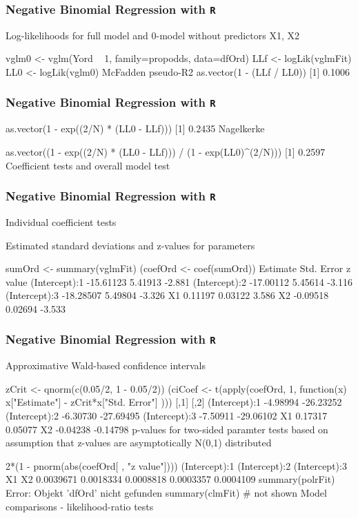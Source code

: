 \begin{frame}[fragile]
\frametitle{Negative Binomial Regression with \texttt{R} }
\Large
Log-likelihoods for full model and 0-model without predictors X1, X2

vglm0 <- vglm(Yord ~ 1, family=propodds, data=dfOrd)
LLf   <- logLik(vglmFit)
LL0   <- logLik(vglm0)
McFadden pseudo-R2
as.vector(1 - (LLf / LL0))
[1] 0.1006
\end{frame}
\begin{frame}[fragile]
\frametitle{Negative Binomial Regression with \texttt{R} }
\Large
as.vector(1 - exp((2/N) * (LL0 - LLf)))
[1] 0.2435
Nagelkerke

as.vector((1 - exp((2/N) * (LL0 - LLf))) / (1 - exp(LL0)^(2/N)))
[1] 0.2597
Coefficient tests and overall model test
\end{frame}
\begin{frame}[fragile]
\frametitle{Negative Binomial Regression with \texttt{R} }
\Large
Individual coefficient tests

Estimated standard deviations and z-values for parameters

sumOrd   <- summary(vglmFit)
(coefOrd <- coef(sumOrd))
               Estimate Std. Error z value
(Intercept):1 -15.61123    5.41913  -2.881
(Intercept):2 -17.00112    5.45614  -3.116
(Intercept):3 -18.28507    5.49804  -3.326
X1              0.11197    0.03122   3.586
X2             -0.09518    0.02694  -3.533
\end{frame}
\begin{frame}[fragile]
\frametitle{Negative Binomial Regression with \texttt{R} }
\Large
Approximative Wald-based confidence intervals

zCrit   <- qnorm(c(0.05/2, 1 - 0.05/2))
(ciCoef <- t(apply(coefOrd, 1, function(x) x["Estimate"] - zCrit*x["Std. Error"] )))
                  [,1]      [,2]
(Intercept):1 -4.98994 -26.23252
(Intercept):2 -6.30730 -27.69495
(Intercept):3 -7.50911 -29.06102
X1             0.17317   0.05077
X2            -0.04238  -0.14798
p-values for two-sided paramter tests based on assumption that z-values are asymptotically N(0,1) distributed

2*(1 - pnorm(abs(coefOrd[ , "z value"])))
(Intercept):1 (Intercept):2 (Intercept):3            X1            X2 
    0.0039671     0.0018334     0.0008818     0.0003357     0.0004109 
summary(polrFit)
Error: Objekt 'dfOrd' nicht gefunden
summary(clmFit)
# not shown
Model comparisons - likelihood-ratio tests
\end{frame}
